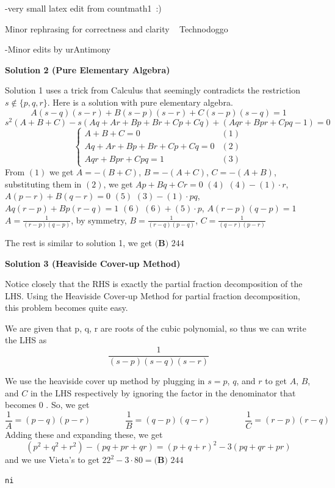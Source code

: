 \begin{enumerate}
 -very small latex edit from countmath1 :)

 Minor rephrasing for correctness and clarity ~ Technodoggo

 -Minor edits by urAntimony

 



\textbf{Solution 2 (Pure Elementary Algebra)}

Solution 1 uses a trick from Calculus that seemingly contradicts the restriction $s\not\in\{p,q,r\}$. Here is a solution with pure elementary algebra.
 \[A(s-q)(s-r) + B(s-p)(s-r) + C(s-p)(s-q)=1\]
 \[s^2(A+B+C)-s(Aq+Ar+Bp+Br+Cp+Cq)+(Aqr+Bpr+Cpq-1)=0\]
 \[\begin{cases} A+B+C=0 & (1)\\ Aq+Ar+Bp+Br+Cp+Cq=0 & (2)\\ Aqr+Bpr+Cpq=1 & (3) \end{cases}\]From $(1)$ we get $A=-(B+C)$, $B=-(A+C)$, $C=-(A+B)$, substituting them in $(2)$, we get $Ap + Bq + Cr=0$ $(4)$
$(4)- (1) \cdot r$, $A(p-r)+B(q-r)=0$ $(5)$
$(3) - (1) \cdot pq$, $Aq(r-p)+Bp(r-q)=1$ $(6)$
$(6) + (5) \cdot p$, $A(r-p)(q-p)=1$
$A = \frac{1}{(r-p)(q-p)}$, by symmetry, $B = \frac{1}{(r-q)(p-q)}$, $C = \frac{1}{(q-r)(p-r)}$

 The rest is similar to solution 1, we get $\boxed{\textbf{(B) } 244}$




\textbf{Solution 3 (Heaviside Cover-up Method)}

Notice closely that the RHS is exactly the partial fraction decomposition of the LHS. Using the Heaviside Cover-up Method for partial fraction decomposition, this problem becomes quite easy.

 We are given that p, q, r are roots of the cubic polynomial, so thus we can write the LHS as 
 \[\frac{1}{(s-p)(s-q)(s-r)}\]

 We use the heaviside cover up method by plugging in $s=p$, $q$, and $r$ to get $A$, $B$, and $C$ in the LHS respectively by ignoring the factor in the denominator that becomes 0 . So, we get 
 \[\frac{1}{A} = (p-q)(p-r) \qquad \qquad \frac{1}{B} = (q-p)(q-r) \qquad \qquad \frac{1}{C} = (r-p)(r-q)\] Adding these and expanding these, we get 
 \[(p^2 + q^2 + r^2) - (pq + pr + qr) = (p+q+r)^2 - 3(pq + qr + pr)\] and we use Vieta's to get $22^2 - 3 \cdot 80 = \boxed{\textbf{(B) } 244}$
\begin{verbatim}
ni
\end{verbatim}





\end{enumerate}
